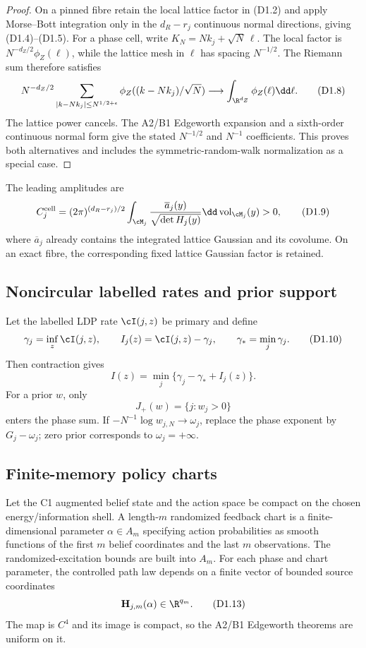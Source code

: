 \begin{proof}
On a pinned fibre retain the local lattice factor in (D1.2) and apply
Morse--Bott integration only in the $d_R-r_j$ continuous normal directions,
giving (D1.4)--(D1.5).  For a phase cell, write
$K_N=Nk_j+\sqrt N\,\ell$.  The local factor is
$N^{-d_Z/2}\phi_Z(\ell)$, while the lattice mesh in $\ell$ has spacing
$N^{-1/2}$.  The Riemann sum therefore satisfies
\[
 N^{-d_Z/2}\sum_{|k-Nk_j|\le N^{1/2+\epsilon}}
 \phi_Z((k-Nk_j)/\sqrt N)\longrightarrow
 \int_{\R^{d_Z}}\phi_Z(\ell)\dd\ell.                    \tag{D1.8}
\]
The lattice power cancels.  The A2/B1 Edgeworth expansion and a sixth-order
continuous normal form give the stated $N^{-1/2}$ and $N^{-1}$ coefficients.
This proves both alternatives and includes the symmetric-random-walk
normalization as a special case.
\end{proof}

The leading amplitudes are
\[
 C_j^{\rm cell}=(2\pi)^{(d_R-r_j)/2}
 \int_{\cM_j}{\overline a_j(y)\over\sqrt{\det H_j(y)}}
 \dd\operatorname{vol}_{\cM_j}(y)>0,                     \tag{D1.9}
\]
where $\overline a_j$ already contains the integrated lattice Gaussian and its
covolume.  On an exact fibre, the corresponding fixed lattice Gaussian factor
is retained.

\subsection{Noncircular labelled rates and prior support}

Let the labelled LDP rate $\cI(j,z)$ be primary and define
\[
 \gamma_j=\inf_z\cI(j,z),\qquad
 I_j(z)=\cI(j,z)-\gamma_j,\qquad
 \gamma_*=\min_j\gamma_j.                                \tag{D1.10}
\]
Then contraction gives
\[
 I(z)=\min_j\{\gamma_j-\gamma_*+I_j(z)\}.                 \tag{D1.11}
\]
For a prior $w$, only
\[
 J_+(w)=\{j:w_j>0\}                                      \tag{D1.12}
\]
enters the phase sum.  If
$-N^{-1}\log w_{j,N}\to\omega_j$, replace the phase exponent by
$G_j-\omega_j$; zero prior corresponds to $\omega_j=+\infty$.

\subsection{Finite-memory policy charts}

Let the C1 augmented belief state and the action space be compact on the
chosen energy/information shell.  A length-$m$ randomized feedback chart is a
finite-dimensional parameter $\alpha\in A_m$ specifying action probabilities
as smooth functions of the first $m$ belief coordinates and the last $m$
observations.  The randomized-excitation bounds are built into $A_m$.
For each phase and chart parameter, the controlled path law depends on a
finite vector of bounded source coordinates
\[
 \mathbf H_{j,m}(\alpha)\in\R^{q_m}.                      \tag{D1.13}
\]
The map is $C^4$ and its image is compact, so the A2/B1 Edgeworth theorems are
uniform on it.

